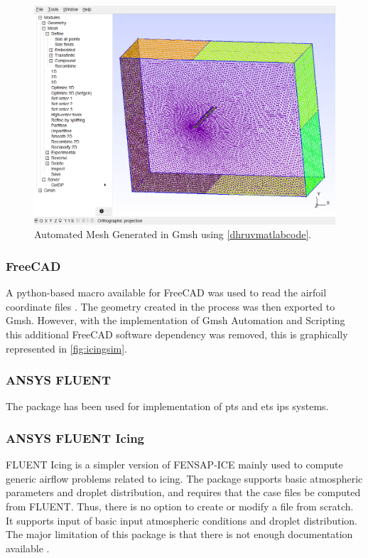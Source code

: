\documentclass[english]{kththesis}
\begin{document}
\begin{figure}[!htb]
    \centering
    \includegraphics[width=1\textwidth]{IPS/gmsh.png}
    \caption{Automated Mesh Generated in Gmsh using \ref{dhruvmatlabcode}.}
    \label{fig:gmsh}
\end{figure}
\subsubsection {FreeCAD}
A python-based macro available for FreeCAD was used to read the airfoil coordinate files \cite{freecad}. The geometry created in the process was then exported to Gmsh. However, with the implementation of Gmsh Automation and Scripting this additional FreeCAD software dependency was removed, this is graphically represented in \ref{fig:icingsim}.
\subsubsection {ANSYS FLUENT}
The package has been used for implementation of \acrshort{pts} and \acrshort{ets} \acrshort{ips} systems.
\subsubsection {ANSYS FLUENT Icing}
FLUENT Icing is a simpler version of FENSAP-ICE \cite{Habashi2004} mainly used to compute generic airflow problems related to icing. The package supports basic atmospheric parameters and droplet distribution, and requires that the case files be computed from FLUENT. Thus, there is no option to create or modify a file from scratch. It supports input of basic input atmospheric conditions and droplet distribution. The major limitation of this package is that there is not enough documentation available \cite{fluenticing}.
\end{document}
